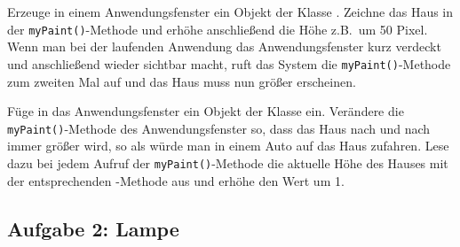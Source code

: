 \begin{compactenum}[a)]
\item Erzeuge in einem Anwendungsfenster ein Objekt der Klasse .
Zeichne das Haus in der \lstinline|myPaint()|-Methode und erhöhe anschließend
die Höhe z.B.\ um 50 Pixel. Wenn man bei der laufenden Anwendung das
Anwendungsfenster kurz verdeckt und anschließend wieder sichtbar macht, ruft
das System die \lstinline|myPaint()|-Methode zum zweiten Mal auf und das Haus
muss nun größer erscheinen.

\item Füge in das Anwendungsfenster ein Objekt der Klasse  ein.
Verändere die \lstinline|myPaint()|-Methode des Anwendungsfenster so, dass das
Haus nach und nach immer größer wird, so als würde man in einem Auto auf das
Haus zufahren. Lese dazu bei jedem Aufruf der \lstinline|myPaint()|-Methode die
aktuelle Höhe des Hauses mit der entsprechenden -Methode aus und
erhöhe den Wert um 1.
\end{compactenum}


\subsection{Aufgabe 2: Lampe}

